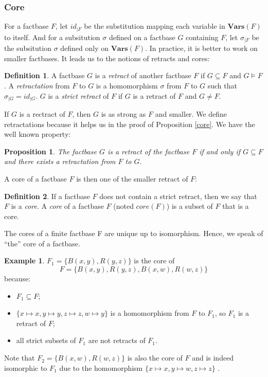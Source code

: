 \documentclass{article}
\newtheorem{proposition}{Proposition}[section]
\theoremstyle{definition}
\newtheorem{definition}{Definition}[section]
\newtheorem{example}{Example}[section]
\theoremstyle{remark}
\newcommand{\Vars}{\textbf{Vars}}
\begin{document}
\subsubsection{Core}

For a factbase $F$, let $id_{|F}$ be the substitution mapping each variable in $\Vars(F)$ to itself. And for a subsitution $\sigma$ defined on a factbase $G$ containing $F$, let $\sigma_{|F}$ be the subsitution $\sigma$ defined only on $\Vars(F)$. In practice, it is better to work on smaller factbases. It leads us to the notions of retracts and cores:

\begin{definition}
A factbase $G$ is a \emph{retract} of another factbase $F$ if $G \subseteq F$ and $G \models F$. A \emph{retractation} from $F$ to $G$ is a homomorphism $\sigma$ from $F$ to $G$ such that $\sigma_{|G}=id_{|G}$. $G$ is a \emph{strict retract} of $F$ if $G$ is a retract of $F$ and $G \neq F$.
\end{definition}

If $G$ is a rectract of $F$, then $G$ is as strong as $F$ and smaller. We define retractations because it helps us in the proof of Proposition \ref{core}. We have the well known property:


\begin{proposition} \label{retract}
The factbase $G$ is a retract of the factbase $F$ if and only if $G \subseteq F$  and there exists a retractation from $F$ to $G$.
\end{proposition}

A core of a factbase $F$ is then one of the smaller retract of $F$:

\begin{definition}
If a factbase $F$ does not contain a strict retract, then we say that $F$ is a \emph{core}. A \emph{core} of a factbase $F$ (noted \emph{$\textit{core}(F)$}) is a subset of $F$ that is a core.
\end{definition}

The cores of a finite factbase F are unique up to isomorphism. Hence, we speak of ``the'' core of a factbase.

\begin{example}
$F_1 = \{B(x,y),R(y,z)\}$ is the core of $$F = \{B(x,y),R(y,z),B(x,w),R(w,z)\}$$ because:
\begin{itemize}
\item $F_1 \subseteq F$;
\item $\{x \mapsto x, y \mapsto y, z \mapsto z, w \mapsto y\}$ is a homomorphism from $F$ to $F_1$, so $F_1$ is a retract of $F$;
\item all strict subsets of $F_1$ are not retracts of $F_1$.
\end{itemize}
Note that $F_2 = \{B(x,w),R(w,z)\}$ is also the core of $F$ and is indeed isomorphic to $F_1$ due to the homomorphism $\{x \mapsto x, y \mapsto w, z \mapsto z\}$ .
\end{example}
\end{document}

